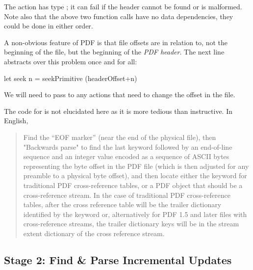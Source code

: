 The action  has type ;
it can fail if the header cannot be found or is malformed.
%
Note also that the above two function calls have no data dependencies, they
could be done in either order.

A non-obvious feature of PDF is that file offsets are in relation to, not the
beginning of the file, but the beginning of the \emph{PDF header}.
%
The next line abstracts over this problem once and for all:
\begin{code}  
    let seek n = seekPrimitive (headerOffset+n)
\end{code}
We will need to pass  to any actions that need to change
the offset in the file.

The code for  is
not elucidated here as it is more tedious than instructive.
In English,
\begin{quote}
Find the ``EOF marker''  (near the end of the physical
file), then "Backwards parse" to find the last 
keyword followed by an end-of-line sequence and an integer value
encoded as a sequence of ASCII bytes representing the byte offset in
the PDF file (which is then adjusted for any preamble to a physical
byte offset), and then locate either the  keyword for
traditional PDF cross-reference tables, or a PDF object that should be
a cross-reference stream.  In the case of traditional PDF
cross-reference tables, after the cross reference table will be the
trailer dictionary identified by the  keyword or,
alternatively for PDF 1.5 and later files with cross-reference
streams, the trailer dictionary keys will be in the stream extent
dictionary of the cross reference stream.
\end{quote}

\subsection{Stage 2: Find \& Parse Incremental Updates}

\lstset{numbers=right}
\lstset{numbers=none}

